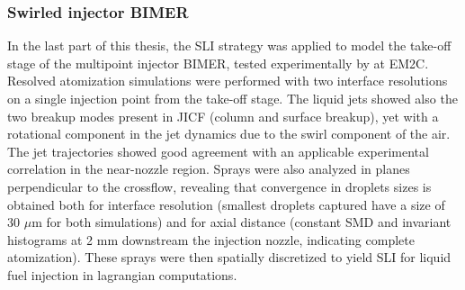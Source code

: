 \subsubsection*{Swirled injector BIMER}

In the last part of this thesis, the SLI strategy was applied to model the take-off stage of the multipoint injector BIMER, tested experimentally by  at EM2C. Resolved atomization simulations were performed with two interface resolutions on a single injection point from the take-off stage. The liquid jets showed also the two breakup modes present in JICF (column and surface breakup), yet with a rotational component in the jet dynamics due to the swirl component of the air. The jet trajectories showed good agreement with an applicable experimental correlation in the near-nozzle region. Sprays were also analyzed in planes perpendicular to the crossflow, revealing that convergence in droplets sizes is obtained both for interface resolution (smallest droplets captured have a size of 30 $\mu$m for both simulations) and for axial distance (constant SMD and invariant histograms at 2 mm downstream the injection nozzle, indicating complete atomization). These sprays were then spatially discretized to yield SLI for liquid fuel injection in lagrangian computations. \\

